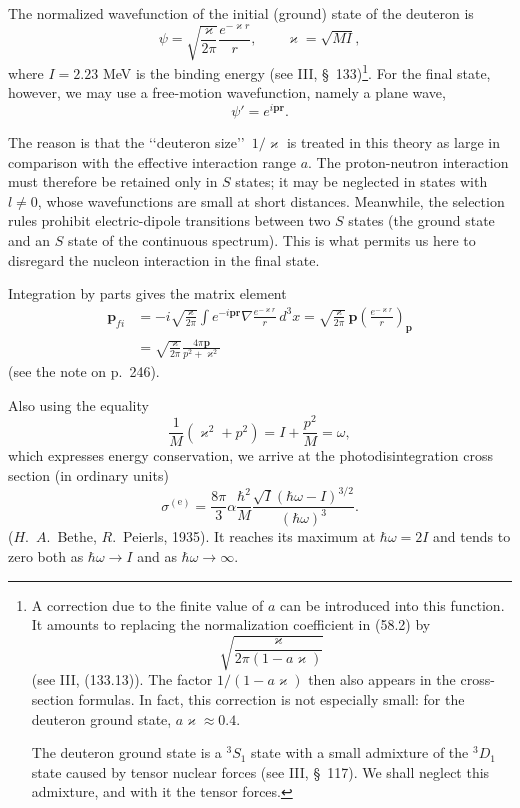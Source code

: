 The normalized wavefunction of the initial (ground) state of the deuteron is
\begin{equation}
\psi=\sqrt{\frac{\varkappa}{2\pi}}\frac{e^{-\varkappa r}}r,
\qquad \varkappa=\sqrt{MI},
\tag{58.2}
\end{equation}
where $I=2.23$ MeV is the binding energy (see III, \S~133)\footnote{A correction due to the finite value of $a$ can be introduced into this function. It amounts to replacing the normalization coefficient in (58.2) by
\[
\sqrt{\frac{\varkappa}{2\pi(1-a\varkappa)}}
\]
(see III, (133.13)). The factor $1/(1-a\varkappa)$ then also appears in the cross-section formulas. In fact, this correction is not especially small: for the deuteron ground state, $a\varkappa\approx0.4$.

The deuteron ground state is a $^{3}S_1$ state with a small admixture of the $^{3}D_1$ state caused by tensor nuclear forces (see III, \S~117). We shall neglect this admixture, and with it the tensor forces.}. For the final state, however, we may use a free-motion wavefunction, namely a plane wave,
\begin{equation}
\psi'=e^{i\mathbf p\mathbf r}.
\tag{58.3}
\end{equation}

The reason is that the \lq\lq deuteron size\rq\rq\ $1/\varkappa$ is treated in this theory as large in comparison with the effective interaction range $a$. The proton-neutron interaction must therefore be retained only in $S$ states; it may be neglected in states with $l\ne0$, whose wavefunctions are small at short distances. Meanwhile, the selection rules prohibit electric-dipole transitions between two $S$ states (the ground state and an $S$ state of the continuous spectrum). This is what permits us here to disregard the nucleon interaction in the final state.

Integration by parts gives the matrix element
\[
\begin{aligned}
\mathbf p_{fi}
&=-i\sqrt{\frac{\varkappa}{2\pi}}
\int e^{-i\mathbf p\mathbf r}\nabla\frac{e^{-\varkappa r}}r\,d^3x
=\sqrt{\frac{\varkappa}{2\pi}}\,\mathbf p
\left(\frac{e^{-\varkappa r}}r\right)_{\!\mathbf p}\\
&=\sqrt{\frac{\varkappa}{2\pi}}\frac{4\pi\mathbf p}{p^2+\varkappa^2}
\end{aligned}
\]
(see the note on p.~246).

Also using the equality
\[
\frac1M(\varkappa^2+p^2)=I+\frac{p^2}{M}=\omega,
\]
which expresses energy conservation, we arrive at the photodisintegration cross section (in ordinary units)
\begin{equation}
\sigma^{(\mathrm e)}=\frac{8\pi}{3}\alpha\frac{\hbar^2}{M}
\frac{\sqrt I(\hbar\omega-I)^{3/2}}{(\hbar\omega)^3}.
\tag{58.4}
\end{equation}
($H$.~$A$.~Bethe, $R$.~Peierls, 1935). It reaches its maximum at $\hbar\omega=2I$ and tends to zero both as $\hbar\omega\to I$ and as $\hbar\omega\to\infty$.

